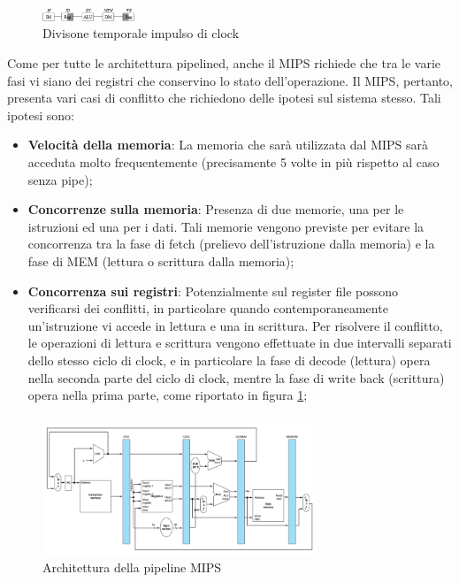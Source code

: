 \begin{figure}[ht]
    \centering
    \includegraphics[width=0.25\textwidth]{img/MIPS_clock_split.png}
    \caption{Divisone temporale impulso di clock}
    \label{img:MIPS_divisione_clock}
\end{figure}

Come per tutte le architettura pipelined, anche il MIPS richiede che tra le varie fasi vi siano dei registri che conservino lo stato dell'operazione.
Il MIPS, pertanto, presenta vari casi di conflitto che richiedono delle ipotesi sul sistema stesso. Tali ipotesi sono:

\begin{itemize}
    \item \textbf{Velocità della memoria}: La memoria che sarà utilizzata dal MIPS sarà acceduta molto frequentemente (precisamente 5 volte in più rispetto al caso senza pipe);
    \item \textbf{Concorrenze sulla memoria}: Presenza di due memorie, una per le istruzioni ed una per i dati. Tali memorie vengono previste per evitare la concorrenza tra la fase di fetch (prelievo dell'istruzione dalla memoria) e la fase di MEM (lettura o scrittura dalla memoria);
    \item \textbf{Concorrenza sui registri}: Potenzialmente sul register file possono verificarsi dei conflitti, in particolare quando contemporaneamente un'istruzione vi accede in lettura e una in scrittura. Per risolvere il conflitto, le operazioni di lettura e scrittura vengono effettuate in due intervalli separati dello stesso ciclo di clock, e in particolare la fase di decode (lettura) opera nella seconda parte del ciclo di clock, mentre la fase di write back (scrittura) opera nella prima parte, come riportato in figura \ref{img:MIPS_divisione_clock};
\end{itemize}

\begin{figure}[ht]
    \centering
    \includegraphics[width=0.75\textwidth]{img/MIPS_architettura_pipeline.png}
    \caption{Architettura della pipeline MIPS}
    \label{img:MIPS_architettura_pipeline}
\end{figure}

